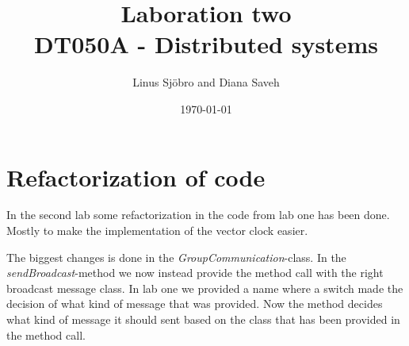 \documentclass[12pt]{article}
\title{Laboration two \\ \large{DT050A - Distributed systems}}
\author{Linus Sjöbro and Diana Saveh}
\date{\today}
\begin{document}
\maketitle

\section{Refactorization of code}
 In the second lab some refactorization in the code from lab one has been done. Mostly to make the implementation of the vector clock easier.
\bigskip

The biggest changes is done in the \textit{GroupCommunication}-class. In the  \textit{sendBroadcast}-method we now instead provide the method call with the right broadcast message class. In lab one we provided a name where a switch made the decision of what kind of message that was provided. Now the method decides what kind of message it should sent based on the class that has been provided in the method call.


\newpage

\end{document}
